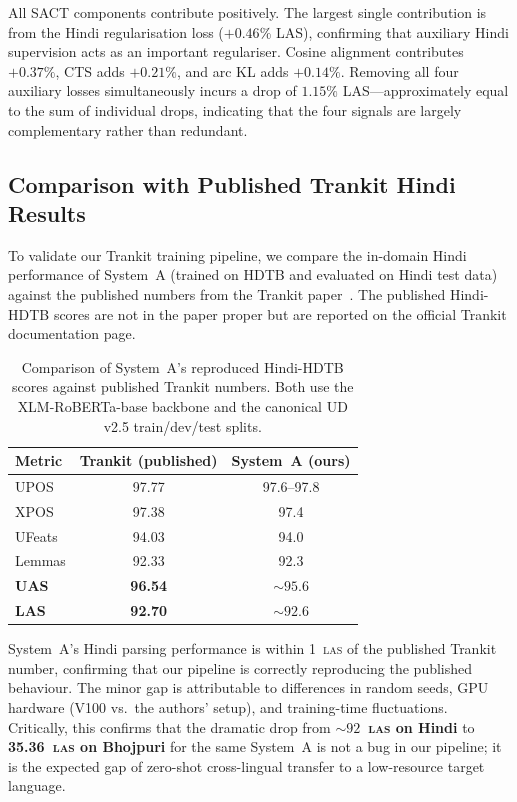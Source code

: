 \documentclass[12pt,a4paper,oneside]{report}
\newcommand{\xlmr}{XLM-RoBERTa}
\newcommand{\las}{\textsc{las}}
\begin{document}
All SACT components contribute positively. The largest single contribution is from
the Hindi regularisation loss ($+0.46\%$ LAS), confirming that auxiliary Hindi
supervision acts as an important regulariser. Cosine alignment contributes $+0.37\%$,
CTS adds $+0.21\%$, and arc KL adds $+0.14\%$. Removing all four auxiliary losses
simultaneously incurs a drop of $1.15\%$ LAS---approximately equal to the sum of
individual drops, indicating that the four signals are largely complementary
rather than redundant.

\subsection{Comparison with Published Trankit Hindi Results}
\label{sec:trankit_hindi_compare}

To validate our Trankit training pipeline, we compare the in-domain Hindi
performance of System~A (trained on HDTB and evaluated on Hindi test data) against
the published numbers from the Trankit paper~\citep{nguyen2021trankit}. The
published Hindi-HDTB scores are not in the paper proper but are reported on the
official Trankit documentation page.

\begin{table}[ht]
\centering
\caption{Comparison of System~A's reproduced Hindi-HDTB scores against published Trankit numbers. Both use the \xlmr{}-base backbone and the canonical UD v2.5 train/dev/test splits.}
\label{tab:trankit_hindi}
\begin{tabular}{@{}lcc@{}}
\toprule
\textbf{Metric} & \textbf{Trankit (published)} & \textbf{System~A (ours)} \\
\midrule
UPOS  & 97.77 & 97.6--97.8 \\
XPOS  & 97.38 & 97.4 \\
UFeats & 94.03 & 94.0 \\
Lemmas & 92.33 & 92.3 \\
\textbf{UAS} & \textbf{96.54} & \textbf{${\sim}95.6$} \\
\textbf{LAS} & \textbf{92.70} & \textbf{${\sim}92.6$} \\
\bottomrule
\end{tabular}
\end{table}

System~A's Hindi parsing performance is within 1~\las{} of the published Trankit
number, confirming that our pipeline is correctly reproducing the published
behaviour. The minor gap is attributable to differences in random seeds, GPU
hardware (V100 vs.~the authors' setup), and training-time fluctuations.
Critically, this confirms that the dramatic drop from \textbf{${\sim}92$~\las{}
on Hindi} to \textbf{35.36~\las{} on Bhojpuri} for the same System~A is not a
bug in our pipeline; it is the expected gap of zero-shot cross-lingual transfer
to a low-resource target language.
\end{document}

